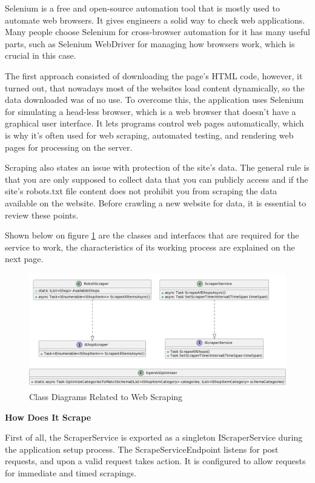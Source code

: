Selenium is a free and open-source automation tool that is mostly used to automate web browsers. It gives engineers a solid way to check web applications. Many people choose Selenium for cross-browser automation for it has many useful parts, such as Selenium WebDriver for managing how browsers work, which is crucial in this case.

The first approach consisted of downloading the page's HTML code, however, it turned out, that nowadays most of the websites load content dynamically, so the data downloaded was of no use. To overcome this, the application uses Selenium for simulating a head-less browser, which is a web browser that doesn't have a graphical user interface. It lets programs control web pages automatically, which is why it's often used for web scraping, automated testing, and rendering web pages for processing on the server.

Scraping also states an issue with protection of the site's data. The general rule is that you are only supposed to collect data that you can publicly access and if the site's robots.txt file content does not prohibit you from scraping the data available on the website. Before crawling a new website for data, it is essential to review these points.

Shown below on figure \ref{fig:scd} are the classes and interfaces that are required for the service to work, the characteristics of its working process are explained on the next page.

\begin{figure}[H]
	\centering
	\includegraphics[width=1\linewidth]{img/scraping_classdiagram.png}
	\caption{Class Diagrams Related to Web Scraping}
	\label{fig:scd}
\end{figure}

\noindent\textbf{How Does It Scrape}

First of all, the ScraperService is exported as a singleton IScraperService during the application setup process. The ScrapeServiceEndpoint listens for post requests, and upon a valid request takes action. It is configured to allow requests for immediate and timed scrapings. 

